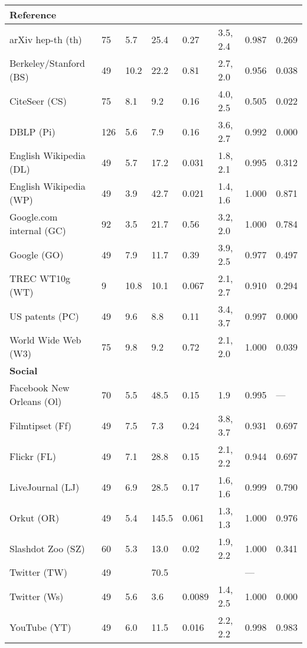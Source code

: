 \begin{longtable}{ llllllll }
\hline
\multicolumn{8}{|l|}{\textbf{Reference}} \\
\hline
arXiv hep-th (\textsf{th})        & 75 & 5.7 & 25.4 & 0.27 & 3.5, 2.4 & 0.987 & 0.269 \\
Berkeley/Stanford (\textsf{BS})   & 49 & 10.2 & 22.2 & 0.81 & 2.7, 2.0 & 0.956 & 0.038 \\
CiteSeer (\textsf{CS})            & 75 & 8.1 & 9.2 & 0.16 & 4.0, 2.5 & 0.505 & 0.022 \\
DBLP (\textsf{Pi})                & 126 & 5.6 & 7.9 & 0.16 & 3.6, 2.7 & 0.992 & 0.000 \\
English Wikipedia (\textsf{DL})   & 49 & 5.7 & 17.2 & 0.031 & 1.8, 2.1 & 0.995 & 0.312 \\
English Wikipedia (\textsf{WP})   & 49 & 3.9 & 42.7 & 0.021 & 1.4, 1.6 & 1.000 & 0.871 \\
Google.com internal (\textsf{GC}) & 92 & 3.5 & 21.7 & 0.56 & 3.2, 2.0 & 1.000 & 0.784 \\
Google (\textsf{GO})              & 49 & 7.9 & 11.7 & 0.39 & 3.9, 2.5 & 0.977 & 0.497 \\
TREC WT10g (\textsf{WT})          & 9 & 10.8 & 10.1 & 0.067 & 2.1, 2.7 & 0.910 & 0.294 \\
US patents (\textsf{PC})          & 49 & 9.6 & 8.8 & 0.11 & 3.4, 3.7 & 0.997 & 0.000 \\
World Wide Web (\textsf{W3})      & 75 & 9.8 & 9.2 & 0.72 & 2.1, 2.0 & 1.000 & 0.039 \\

\hline
\multicolumn{8}{|l|}{\textbf{Social}} \\
\hline
Facebook New Orleans (\textsf{Ol}) & 70 & 5.5 & 48.5 & 0.15 & 1.9 & 0.995 & --- \\
Filmtipset (\textsf{Ff})          & 49 & 7.5 & 7.3 & 0.24 & 3.8, 3.7 & 0.931 & 0.697 \\
Flickr (\textsf{FL})              & 49 & 7.1 & 28.8 & 0.15 & 2.1, 2.2 & 0.944 & 0.697 \\
LiveJournal (\textsf{LJ})         & 49 & 6.9 & 28.5 & 0.17 & 1.6, 1.6 & 0.999 & 0.790 \\
Orkut (\textsf{OR})               & 49 & 5.4 & 145.5 & 0.061 & 1.3, 1.3 & 1.000 & 0.976 \\
Slashdot Zoo (\textsf{SZ})        & 60 & 5.3 & 13.0 & 0.02 & 1.9, 2.2 & 1.000 & 0.341 \\
Twitter (\textsf{TW})             & 49 &   & 70.5 &   &   & --- &   \\
Twitter (\textsf{Ws})             & 49 & 5.6 & 3.6 & 0.0089 & 1.4, 2.5 & 1.000 & 0.000 \\
YouTube (\textsf{YT})             & 49 & 6.0 & 11.5 & 0.016 & 2.2, 2.2 & 0.998 & 0.983 \\


\end{longtable}
